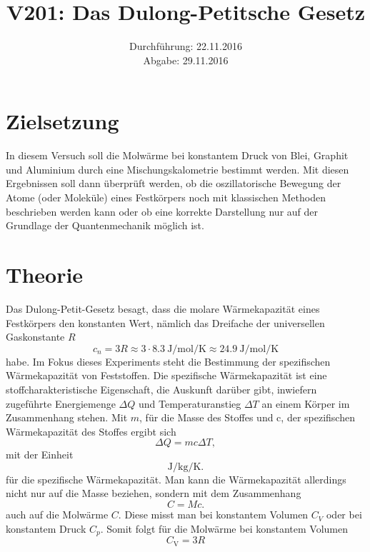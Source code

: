 \documentclass[
  bibliography=totoc,     %
  captions=tableheading,  %
  titlepage=firstiscover, %
]{scrartcl}
\author{%
  AUTOR A%
  \texorpdfstring{%
    \\%
    \href{mailto:authorA@udo.edu}{authorA@udo.edu}
    }{}%
    \texorpdfstring{\and}{, }%
    AUTOR B%
    \texorpdfstring{%
      \\%
      \href{mailto:authorB@udo.edu}{authorB@udo.edu}
    }{}%
  }
\title{V201: Das Dulong-Petitsche Gesetz}
\author{
  Simon Schulte
  \texorpdfstring{
    \\
    \href{mailto:simon.schulte@udo.edu}{simon.schulte@udo.edu}
  }{}
  \texorpdfstring{\and}{, }
  Tim Sedlaczek
  \texorpdfstring{
    \\
    \href{mailto:tim.sedlaczek@udo.edu}{tim.sedlaczek@udo.edu}
  }{}
}
\date{Durchführung: 22.11.2016\\
      Abgabe: 29.11.2016}
\begin{document}
\maketitle
\thispagestyle{empty}
\tableofcontents
\newpage
\section{Zielsetzung}
\label{sec:zielsetzung}
In diesem Versuch soll die Molwärme bei konstantem Druck von Blei, Graphit und
Aluminium durch eine Mischungskalometrie bestimmt werden. Mit diesen Ergebnissen
soll dann überprüft werden, ob die oszillatorische Bewegung der Atome
(oder Moleküle) eines Festkörpers noch mit klassischen Methoden beschrieben
werden kann oder ob eine korrekte Darstellung nur auf der Grundlage der
Quantenmechanik möglich ist.
\section{Theorie}
\label{sec:theorie}
Das Dulong-Petit-Gesetz besagt, dass die molare Wärmekapazität eines Festkörpers
den konstanten Wert, nämlich das Dreifache der universellen Gaskonstante $R$
\begin{equation}
  c_n=3R \approx 3 \cdot \SI{8.3}{\joule\per\mol\per\kelvin} \approx
  \SI{24.9}{\joule\per\mol\per\kelvin}
\end{equation}
habe. Im Fokus dieses Experiments steht die Bestimmung der spezifischen
Wärmekapazität von Feststoffen. Die spezifische Wärmekapazität ist eine
stoffcharakteristische Eigenschaft, die Auskunft darüber gibt, inwiefern
zugeführte Energiemenge $\Delta Q$ und Temperaturanstieg $\Delta T$ an einem Körper im
Zusammenhang stehen. Mit $m$, für die Masse des Stoffes und c, der spezifischen
Wärmekapazität des Stoffes ergibt sich
\begin{equation}
  \Delta Q=mc\Delta T,
\end{equation}
mit der Einheit
\begin{equation*}
  \si{\joule\per\kilogram\per\kelvin}.
\end{equation*}
für die spezifische Wärmekapazität. Man kann die Wärmekapazität allerdings nicht
nur auf die Masse beziehen, sondern mit dem Zusammenhang
\begin{equation}
  C=Mc.
\end{equation}
auch auf die Molwärme $C$. Diese misst man bei konstantem Volumen $C_V$ oder bei
konstantem Druck $C_p$.
Somit folgt für die Molwärme bei konstantem Volumen
\begin{equation}
  C_{\mathup{V}}=3R
\end{equation}
\end{document}
